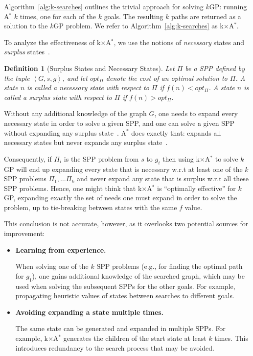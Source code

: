 \documentclass{aicom2e}
\newtheorem{definition}{Definition}
\newcommand{\kgs}{$k$GP}
\newcommand{\astar}{A$^*$}
\newcommand{\kxastar}{k$\times$A$^*$}
\newcommand{\tuple}[1]{\ensuremath{\left \langle #1 \right \rangle }}
\newcommand{\roni}[1]{\textbf{[RS:#1]}}
\begin{document}
Algorithm~\ref{alg:k-searches} outlines the trivial approach for solving
\kgs{}: running \astar{} $k$ times, one for each of the $k$ goals. The
resulting $k$ paths are returned as a solution to the \kgs{} problem. We refer
to Algorithm~\ref{alg:k-searches} as \kxastar{}.


To analyze the effectiveness of \kxastar{}, we use the notions of {\em necessary} states and {\em surplus} states~\cite{goldenberg2014enhanced}.

\begin{definition}[Surplus States and Necessary States]
    Let $\Pi$ be a SPP defined by the tuple $\tuple{G,s,g}$, and let $opt_\Pi$ denote the cost of an optimal solution to $\Pi$.
    A state $n$ is called a {\em necessary} state with respect to $\Pi$ if $f(n)<opt_\Pi$.
    A state $n$ is called a {\em surplus} state with respect to $\Pi$ if $f(n)>opt_\Pi$.
\label{def:surplus}
\end{definition}
Without any additional knowledge of the graph $G$, one needs to expand every necessary state in order to solve a given SPP,
and one can solve a given SPP without expanding any surplus state~\cite{dechter1985generalizedBestFirst,goldenberg2014enhanced}.
\astar{} does exactly that: expands all necessary states but never expands any surplus state~\cite{dechter1985generalizedBestFirst}.


Consequently, if $\Pi_i$ is the SPP problem from $s$ to $g_i$
then using \kxastar{} to solve \kgs{} will end up expanding every state that is necessary w.r.t at least one of the $k$ SPP problems $\Pi_1,\ldots \Pi_k$ and never expand any state that is surplus w.r.t all these SPP problems.
Hence, one might think that \kxastar{} is ``optimally effective'' for \kgs{},
expanding exactly the set of needs one must expand in order to solve the problem, up to tie-breaking between states with the same $f$ value.


This conclusion is not accurate, however, as it overlooks two potential sources for improvement:
\begin{itemize}

\item {\bf Learning from experience.}

When solving one of the $k$ SPP problems (e.g., for finding the optimal path for $g_1$),
one gains additional knowledge of the searched graph, which may be used when solving the subsequent
SPPs for the other goals. For example, propagating heuristic values of states between searches to different goals.

\item {\bf Avoiding expanding a state multiple times.}

The same state can be generated and expanded in multiple SPPs. For example, \kxastar{}
generates the children of the start state at least $k$ times.
This introduces redundancy to the search process that may be avoided.
\end{itemize}
\end{document}
